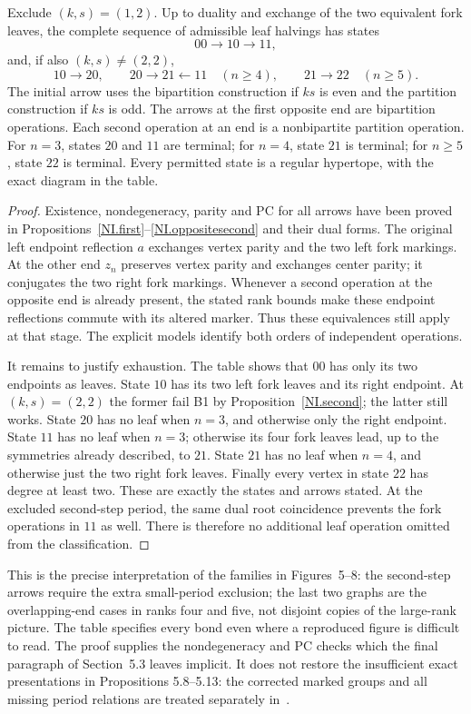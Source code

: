 \begin{theorem}\label{NI.complete}
Exclude $(k,s)=(1,2)$. Up to duality and exchange of the two
equivalent fork leaves, the complete sequence of admissible leaf
halvings has states
\[
 00\longrightarrow10\longrightarrow11,
\]
and, if also $(k,s)\ne(2,2)$,
\[
 10\longrightarrow20,\qquad
 20\longrightarrow21\longleftarrow11\quad(n\ge4),\qquad
 21\longrightarrow22\quad(n\ge5).
\]
The initial arrow uses the bipartition construction if $ks$ is even
and the partition construction if $ks$ is odd. The arrows at the
first opposite end are bipartition operations. Each second operation
at an end is a nonbipartite partition operation.
For $n=3$, states $20$ and $11$ are terminal; for $n=4$, state
$21$ is terminal; for $n\ge5$, state $22$ is terminal.
Every permitted state is a regular hypertope, with the exact diagram
in the table.
\end{theorem}
\begin{proof}
Existence, nondegeneracy, parity and PC for all arrows have been
proved in Propositions~\ref{NI.first}--\ref{NI.oppositesecond} and their
dual forms. The original left endpoint reflection $a$ exchanges
vertex parity and the two left fork markings. At the other end
$z_n$ preserves vertex parity and exchanges center parity; it
conjugates the two right fork markings. Whenever a second operation
at the opposite end is already present, the stated rank bounds
make these endpoint reflections commute with its altered marker.
Thus these equivalences still apply at that stage.
The explicit models identify both orders of independent operations.

It remains to justify exhaustion. The table shows that $00$ has
only its two endpoints as leaves. State $10$ has its two left
fork leaves and its right endpoint. At $(k,s)=(2,2)$ the former
fail B1 by Proposition~\ref{NI.second}; the latter still works.
State $20$ has no leaf when $n=3$, and otherwise only the right
endpoint. State $11$ has no leaf when $n=3$; otherwise its four
fork leaves lead, up to the symmetries already described, to $21$.
State $21$ has no leaf when $n=4$, and otherwise just the two
right fork leaves. Finally every vertex in state $22$ has degree
at least two. These are exactly the states and arrows stated.
At the excluded second-step period, the same dual root coincidence
prevents the fork operations in $11$ as well. There is therefore
no additional leaf operation omitted from the classification.
\end{proof}

This is the precise interpretation of the families in Figures~5--8:
the second-step arrows require the extra small-period exclusion;
the last two graphs are the overlapping-end cases in ranks four
and five, not disjoint copies of the large-rank picture. The table
specifies every bond even where a reproduced figure is difficult
to read. The proof supplies the nondegeneracy and PC checks which
the final paragraph of Section~5.3 leaves implicit. It does not
restore the insufficient exact presentations in Propositions
5.8--5.13: the corrected marked groups and all missing period
relations are treated separately in~\cite{Affine}.

